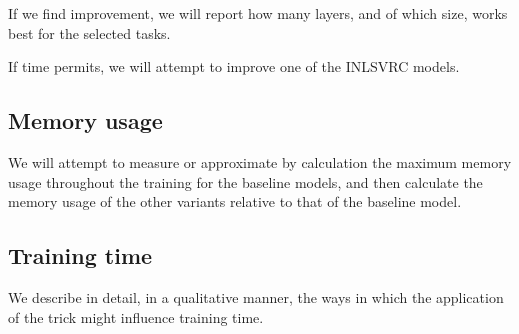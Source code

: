 \documentclass[]{article}
\begin{document}
\begin{multicols}{2}
	If we find improvement, we will report how many layers, and of which size, works best for the selected tasks.
	
	If time permits, we will attempt to improve one of the INLSVRC models.
	
	\subsection{Memory usage}
	We will attempt to measure or approximate by calculation the maximum memory usage throughout the training for the baseline models, and then calculate the memory usage of the other variants relative to that of the baseline model.
	
	\subsection{Training time}
	We describe in detail, in a qualitative manner, the ways in which the application of the trick might influence training time.
	
	
	
\end{multicols}
\end{document}

